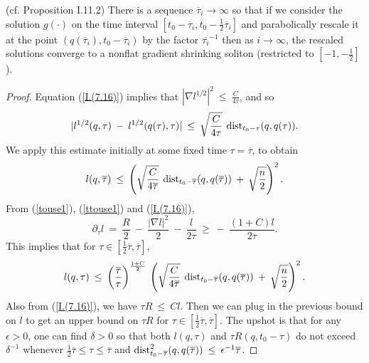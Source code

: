 \begin{proposition}
  \label{prop:kl-asymptotic-solitons-existence-ricci-solitons}
 (cf. Proposition I.11.2) \label{asympsoliton}
There is a sequence $\overline{\tau}_i \rightarrow \infty$ so that if we
consider the solution $g(\cdot)$ on the time interval
$[t_0 - \overline{\tau}_i, t_0 - \frac12 \overline{\tau}_i]$  and
parabolically rescale it
at the point $(q(\overline{\tau}_i), t_0 -
\overline{\tau}_i)$ by the factor $\overline{\tau_i}^{-1}$ then as
$i \rightarrow \infty$, the
rescaled solutions
converge to a nonflat gradient shrinking soliton (restricted to $[-1, - \frac12]$).
\end{proposition}
\begin{proof}

Equation (\ref{I.(7.16)}) implies that
$|\nabla l^{1/2}|^2 \: \le \: \frac{C}{4\tau}$, and so
\begin{equation}
|l^{1/2}(q,\tau) \: - \: l^{1/2}(q(\tau),\tau)| \:
\le \: \sqrt{\frac{C}{4\tau}}
\: \operatorname{dist}_{t_0-\tau}(q, q(\tau)).
\end{equation}
We apply this estimate initially at some fixed time $\tau = \overline{\tau}$, to
obtain
\begin{equation}
l(q, \overline{\tau}) \: \le \: \left( \sqrt{\frac{C}{4\overline{\tau}}}
\: \operatorname{dist}_{t_0- \overline{\tau}}(q, q(\overline{\tau})) \: + \:
\sqrt{\frac{n}{2}} \right)^2.
\end{equation}
From (\ref{touse1}), (\ref{ttouse1}) and (\ref{I.(7.16)}),
\begin{equation}
\partial_\tau l \: = \: \frac{R}{2} \: - \: \frac{|\nabla l|^2}{2}
\: - \: \frac{l}{2\tau} \: \ge \: - \: \frac{(1+C)l}{2\tau}.
\end{equation}
This implies that for $\tau \in \left[ \frac12 \overline{\tau},
\overline{\tau} \right]$,
\begin{equation} \label{upperl}
l(q, {\tau}) \: \le \: \left( \frac{\overline{\tau}}{\tau}
\right)^{\frac{1+C}{2}} \:
\left( \sqrt{\frac{C}{4\overline{\tau}}}
\: \operatorname{dist}_{t_0- \overline{\tau}}(q, q(\overline{\tau})) \: + \:
\sqrt{\frac{n}{2}} \right)^2.
\end{equation}
Also from (\ref{I.(7.16)}), we have
$\tau R \: \le \: Cl$.
Then we can plug in the previous bound on
$l$ to get an upper bound on $\tau R$ for
$\tau \in \left[ \frac12 \overline{\tau}, \overline{\tau} \right]$.
The upshot is that for any $\epsilon > 0$, one can find $\delta > 0$
so that both $l(q,\tau)$ and $\tau R(q, t_0-\tau)$ do not exceed
$\delta^{-1}$ whenever $\frac12 \overline{\tau} \le \tau \le \overline{\tau}$
and $\operatorname{dist}^2_{t_0-\overline{\tau}} (q, q(\overline{\tau})) \: \le \:
\epsilon^{-1} \overline{\tau}$.


\end{proof}

